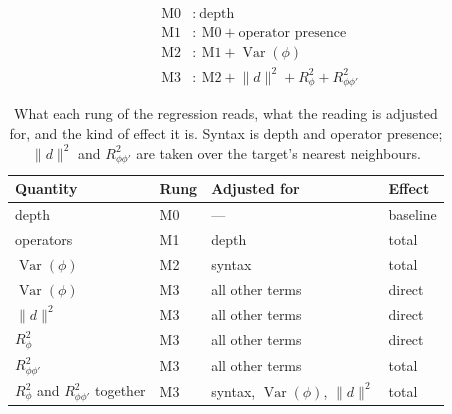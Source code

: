 \documentclass[titlepage,a4paper,11pt]{report}
\newenvironment{RSnewblock}{\par\color{blue!65!black}}{\par}
\begin{document}
    \begin{RSnewblock}
    \begin{equation}\label{eq:diag_ladder}
    \begin{aligned}
        \text{M0}&:\ \text{depth}\\
        \text{M1}&:\ \text{M0} + \text{operator presence}\\
        \text{M2}&:\ \text{M1} + \operatorname{Var}(\phi)\\
        \text{M3}&:\ \text{M2} + \lVert d\rVert^2 + R^2_\phi + R^2_{\phi\phi'}
    \end{aligned}
    \end{equation}

    \begin{table}[ht]
        \color{blue!65!black}
        \centering
        \caption{What each rung of the regression reads, what the reading is adjusted for, and the kind of effect it is. Syntax is depth and operator presence; $\lVert d\rVert^2$ and $R^2_{\phi\phi'}$ are taken over the target's nearest neighbours.}
        \label{tab:diag_readings}
        \begin{tabular}{llll}
            \toprule
            Quantity & Rung & Adjusted for & Effect \\
            \midrule
            depth & M0 & --- & baseline \\
            operators & M1 & depth & total \\
            $\operatorname{Var}(\phi)$ & M2 & syntax & total \\
            $\operatorname{Var}(\phi)$ & M3 & all other terms & direct \\
            $\lVert d\rVert^2$ & M3 & all other terms & direct \\
            $R^2_\phi$ & M3 & all other terms & direct \\
            $R^2_{\phi\phi'}$ & M3 & all other terms & total \\
            $R^2_\phi$ and $R^2_{\phi\phi'}$ together & M3 & syntax, $\operatorname{Var}(\phi)$, $\lVert d\rVert^2$ & total \\
            \bottomrule
        \end{tabular}
    \end{table}
    \end{RSnewblock}
\end{document}
